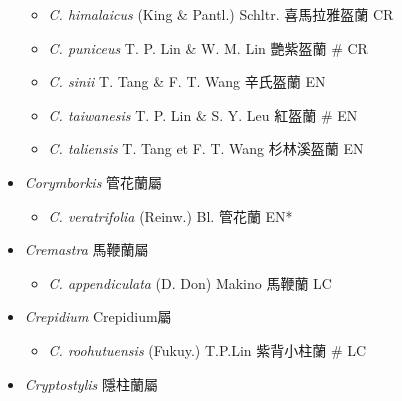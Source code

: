 \begin{itemize}
  \begin{itemize}
        \item[] \textit{C. himalaicus} (King \& Pantl.) Schltr.  喜馬拉雅盔蘭   CR
        \item[] \textit{C. puniceus} T. P. Lin \& W. M. Lin  艷紫盔蘭  \# CR
        \item[] \textit{C. sinii} T. Tang \& F. T. Wang  辛氏盔蘭   EN
        \item[] \textit{C. taiwanesis} T. P. Lin \& S. Y. Leu  紅盔蘭  \# EN
        \item[] \textit{C. taliensis} T. Tang et F. T. Wang  杉林溪盔蘭   EN
  \end{itemize}
 \item[] \textit{Corymborkis} 管花蘭屬
                                
  \begin{itemize}
        \item[] \textit{C. veratrifolia} (Reinw.) Bl.  管花蘭   EN*
  \end{itemize}
 \item[] \textit{Cremastra} 馬鞭蘭屬
                                
  \begin{itemize}
        \item[] \textit{C. appendiculata} (D. Don) Makino  馬鞭蘭   LC
  \end{itemize}
 \item[] \textit{Crepidium} Crepidium屬
                                
  \begin{itemize}
        \item[] \textit{C. roohutuensis} (Fukuy.) T.P.Lin  紫背小柱蘭  \# LC
  \end{itemize}
 \item[] \textit{Cryptostylis} 隱柱蘭屬
                                

\end{itemize}

